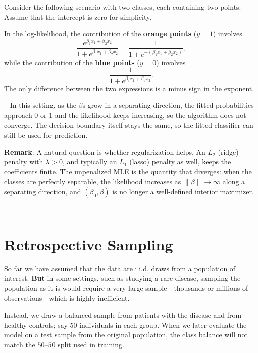 \documentclass[
]{book}
\begin{document}
Consider the following scenario with two classes, each containing two points. Assume that the intercept is zero for simplicity.

In the log-likelihood, the contribution of the \textbf{orange points} (\(y=1\)) involves
\[\frac{e^{\beta_1 x_1 + \beta_2 x_2}}{1 + e^{\beta_1 x_1 + \beta_2 x_2}} = \frac{1}{1+ e^{-(\beta_1 x_1 + \beta_2 x_2)}},\]
while the contribution of the \textbf{blue points} (\(y=0\)) involves
\[\frac{1}{1 + e^{\beta_1 x_1 + \beta_2 x_2}}.\]
The only difference between the two expressions is a minus sign in the exponent.

~
In this setting, as the \(\beta\)s grow in a separating direction, the fitted probabilities approach \(0\) or \(1\) and the likelihood keeps increasing, so the algorithm does not converge. The decision boundary itself stays the same, so the fitted classifier can still be used for prediction.

\textbf{Remark}: A natural question is whether regularization helps. An \(L_2\) (ridge) penalty with \(\lambda>0\), and typically an \(L_1\) (lasso) penalty as well, keeps the coefficients finite. The unpenalized MLE is the quantity that diverges: when the classes are perfectly separable, the likelihood increases as \(\|\beta\|\to\infty\) along a separating direction, and \((\beta_0,\beta)\) is no longer a well-defined interior maximizer.

~~

\section{Retrospective Sampling}\label{retrospective-sampling}

So far we have assumed that the data are i.i.d. draws from a population of interest. \textbf{But} in some settings, such as studying a rare disease, sampling the population as it is would require a very large sample---thousands or millions of observations---which is highly inefficient.

Instead, we draw a balanced sample from patients with the disease and from healthy controls; say \(50\) individuals in each group. When we later evaluate the model on a test sample from the original population, the class balance will not match the \(50\)--\(50\) split used in training.

~
\end{document}
